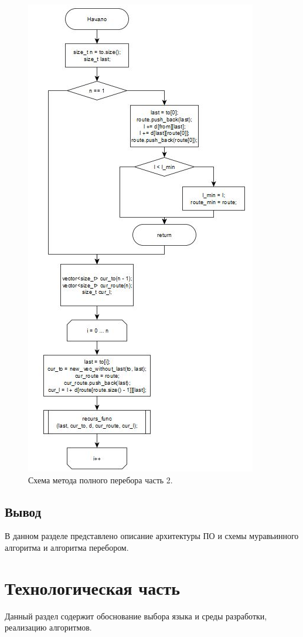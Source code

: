 \documentclass[12pt]{report}
\begin{document}
	\begin{figure}[H]
		\begin{center}
			\includegraphics[scale=1]{img/enumeration2.png}
			\caption{Схема метода полного перебора часть 2.}
			\label{fig:en2}
		\end{center}
	\end{figure}
	
	\section*{Вывод}
	В данном разделе представлено описание архитектуры ПО и схемы муравьинного алгоритма и алгоритма перебором.
	
	\chapter{Технологическая часть}
	Данный раздел содержит обоснование выбора языка и среды разработки, реализацию алгоритмов.
	
\end{document}

